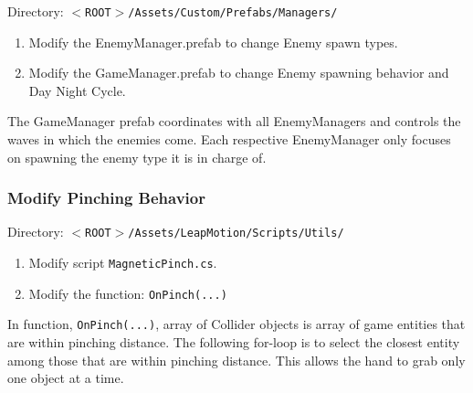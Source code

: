 \documentclass[a4paper]{refart}
\begin{document}
Directory: \texttt{$<$ROOT$>$/Assets/Custom/Prefabs/Managers/}

\begin{enumerate}
	\item Modify the EnemyManager.prefab to change Enemy spawn types.
	\item Modify the GameManager.prefab to change Enemy spawning behavior and Day Night Cycle.
\end{enumerate}

The GameManager prefab coordinates with all EnemyManagers and controls the waves in which the enemies come. Each respective EnemyManager only focuses on spawning the enemy type it is in charge of.

\subsubsection{Modify Pinching Behavior}

Directory: \texttt{$<$ROOT$>$/Assets/LeapMotion/Scripts/Utils/}

\begin{enumerate}
	\item Modify script \texttt{MagneticPinch.cs}.
	\item Modify the function: \texttt{OnPinch(...)}
\end{enumerate}

In function, \texttt{OnPinch(...)}, array of Collider objects is array of game entities that are within pinching distance. The following for-loop is to select the closest entity among those that are within pinching distance. This allows the hand to grab only one object at a time.
\end{document}

